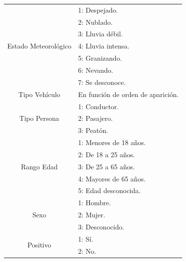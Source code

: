 \begin{enumerate}
\begin{table}[H]
\begin{minipage}{0.4\textwidth}
\begin{tabular}{|c|l|}
                                \multirow{7}{*}{Estado Meteorológico}   & 1: Despejado.\\
                                                                        & 2: Nublado.\\
                                                                        & 3: Lluvia débil.\\
                                                                        & 4: Lluvia intensa.\\
                                                                        & 5: Granizando.\\
                                                                        & 6: Nevando.\\
                                                                        & 7: Se desconoce.\\
                                \hline
                                \multirow{1}{*}{Tipo Vehículo}          & En función de orden de aparición.\\

                                \hline
                                \multirow{3}{*}{Tipo Persona}           & 1: Conductor.\\
                                                                        & 2: Pasajero.\\
                                                                        & 3: Peatón.\\
                                \hline
                                \multirow{5}{*}{Rango Edad}             & 1: Menores de 18 años.\\
                                                                        & 2: De 18 a 25 años.\\
                                                                        & 3: De 25 a 65 años.\\
                                                                        & 4: Mayores de 65 años.\\
                                                                        & 5: Edad desconocida.\\
                                \hline
                                \multirow{3}{*}{Sexo}                   & 1: Hombre.\\
                                                                        & 2: Mujer.\\
                                                                        & 3: Desconocido.\\
                                \hline
                                \multirow{2}{*}{Positivo}               & 1: Sí.\\
                                                                        & 2: No.\\
                                \hline
                            \end{tabular}
                        \end{minipage}


\end{table}
\end{enumerate}

